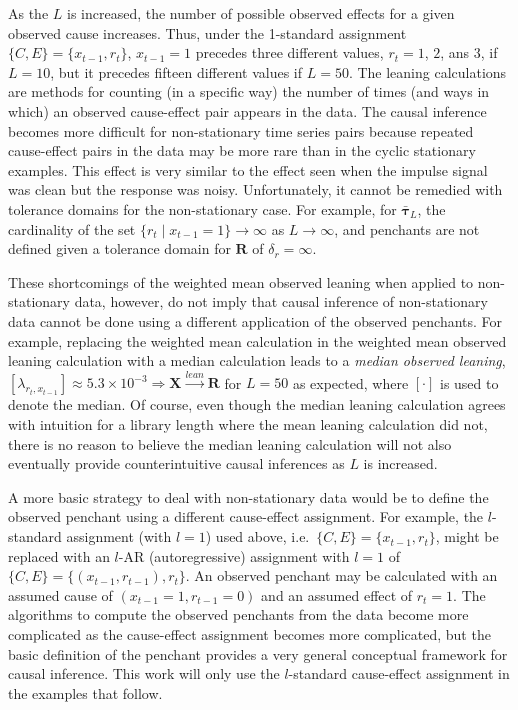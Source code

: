 \documentclass[a4paper,11pt,twocolumn]{article}
\begin{document}
As the $L$ is increased, the number of possible observed effects for a given observed cause increases.  Thus, under the 1-standard assignment $\{C,E\} = \{x_{t-1},r_t\}$, $x_{t-1}=1$ precedes three different values, $r_t = 1$, $2$, ans $3$, if $L=10$, but it precedes fifteen different values if $L=50$.  The leaning calculations are methods for counting (in a specific way) the number of times (and ways in which) an observed cause-effect pair appears in the data.  The causal inference becomes more difficult for non-stationary time series pairs because repeated cause-effect pairs in the data may be more rare than in the cyclic stationary examples.  This effect is very similar to the effect seen when the impulse signal was clean but the response was noisy.  Unfortunately, it cannot be remedied with tolerance domains for the non-stationary case.  For example, for $\bar{\mathbf{\tau}}_L$, the cardinality of the set $\{r_t\;|\;x_{t-1}=1\}\rightarrow\infty$ as $L\rightarrow\infty$, and penchants are not defined given a tolerance domain for $\mathbf{R}$ of $\delta_r=\infty$.

These shortcomings of the weighted mean observed leaning when applied to non-stationary data, however, do not imply that causal inference of non-stationary data cannot be done using a different application of the observed penchants.  For example, replacing the weighted mean calculation in the weighted mean observed leaning calculation with a median calculation leads to a {\em median observed leaning}, $[\lambda_{r_t,x_{t-1}}] \approx 5.3\times 10^{-3}\Rightarrow \mathbf{X}\xrightarrow{lean}\mathbf{R}$ for $L=50$ as expected, where $[\cdot]$ is used to denote the median.  Of course, even though the median leaning calculation agrees with intuition for a library length where the mean leaning calculation did not, there is no reason to believe the median leaning calculation will not also eventually provide counterintuitive causal inferences as $L$ is increased.  

A more basic strategy to deal with non-stationary data would be to define the observed penchant using a different cause-effect assignment.  For example, the $l$-standard assignment (with $l=1$) used above, i.e.\ $\{C,E\}=\{x_{t-1},r_t\}$, might be replaced with an $l$-AR (autoregressive) assignment with $l=1$ of $\{C,E\}=\{(x_{t-1},r_{t-1}),r_t\}$.  An observed penchant may be calculated with an assumed cause of $(x_{t-1}=1,r_{t-1}=0)$ and an assumed effect of $r_t = 1$.  The algorithms to compute the observed penchants from the data become more complicated as the cause-effect assignment becomes more complicated, but the basic definition of the penchant provides a very general conceptual framework for causal inference.  This work will only use the $l$-standard cause-effect assignment in the examples that follow.
\end{document}
